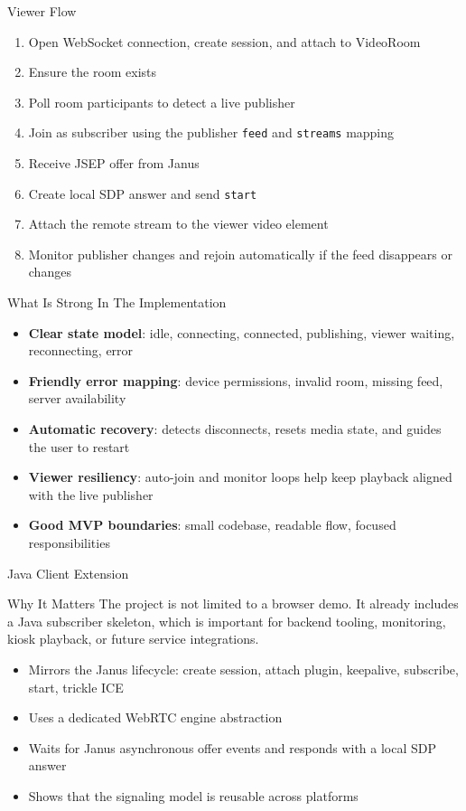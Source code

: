 \documentclass[aspectratio=169]{beamer}
\begin{document}
\begin{frame}{Viewer Flow}
  \begin{enumerate}
    \item Open WebSocket connection, create session, and attach to VideoRoom
    \item Ensure the room exists
    \item Poll room participants to detect a live publisher
    \item Join as subscriber using the publisher \texttt{feed} and \texttt{streams} mapping
    \item Receive JSEP offer from Janus
    \item Create local SDP answer and send \texttt{start}
    \item Attach the remote stream to the viewer video element
    \item Monitor publisher changes and rejoin automatically if the feed disappears or changes
  \end{enumerate}
\end{frame}

\begin{frame}{What Is Strong In The Implementation}
  \begin{itemize}
    \item \textbf{Clear state model}: idle, connecting, connected, publishing, viewer waiting, reconnecting, error
    \item \textbf{Friendly error mapping}: device permissions, invalid room, missing feed, server availability
    \item \textbf{Automatic recovery}: detects disconnects, resets media state, and guides the user to restart
    \item \textbf{Viewer resiliency}: auto-join and monitor loops help keep playback aligned with the live publisher
    \item \textbf{Good MVP boundaries}: small codebase, readable flow, focused responsibilities
  \end{itemize}
\end{frame}

\begin{frame}{Java Client Extension}
  \begin{block}{Why It Matters}
    The project is not limited to a browser demo. It already includes a Java subscriber skeleton, which is important for backend tooling, monitoring, kiosk playback, or future service integrations.
  \end{block}

  \vspace{0.4em}
  \begin{itemize}
    \item Mirrors the Janus lifecycle: create session, attach plugin, keepalive, subscribe, start, trickle ICE
    \item Uses a dedicated WebRTC engine abstraction
    \item Waits for Janus asynchronous offer events and responds with a local SDP answer
    \item Shows that the signaling model is reusable across platforms
  \end{itemize}
\end{frame}
\end{document}
